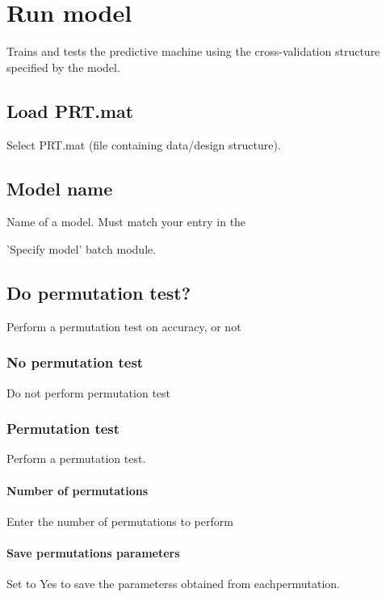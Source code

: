 
\chapter{Run model  \label{Chap:cv_model}}

\vskip 1.5cm

Trains and tests the predictive machine using the cross-validation structure specified by the model.


\section{Load PRT.mat}
Select PRT.mat (file containing data/design structure).


\section{Model name}
Name of a model. Must match your entry in the 

'Specify model' batch module.


\section{Do permutation test?}
Perform a permutation test on accuracy, or not


\subsection{No permutation test}
Do not perform permutation test


\subsection{Permutation test}
Perform a permutation test.


\subsubsection{Number of permutations}
Enter the number of permutations to perform


\subsubsection{Save permutations parameters}
Set to Yes to save the parameterss obtained from eachpermutation.

